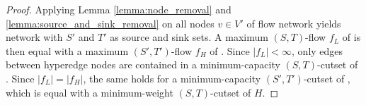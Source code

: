 \begin{proof}

Applying Lemma \ref{lemma:node_removal} and \ref{lemma:source_and_sink_removal}
on all nodes $v \in V'$ of flow network  yields network
 with $S'$ and $T'$ as source and sink sets. A maximum
$(S,T)$-flow $f_L$ of  is then equal with a maximum $(S',T')$-flow $f_H$
of . Since $|f_L| < \infty$, only edges between hyperedge 
nodes are contained in a minimum-capacity $(S,T)$-cutset of . Since $|f_L| = |f_H|$, the same
holds for a minimum-capacity $(S',T')$-cutset of , which is
equal with a minimum-weight $(S,T)$-cutset of $H$.

%

\end{proof}
